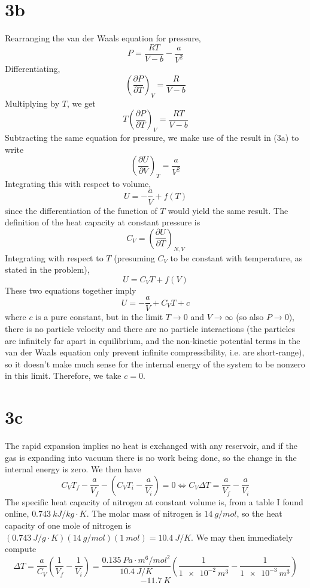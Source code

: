 \documentclass{article}
\begin{document}
\section*{3b}
Rearranging the van der Waals equation for pressure,
\[P=\frac{RT}{V-b}-\frac{a}{V^{2}}\]
Differentiating,
\[\left( \frac{\partial P}{\partial T} \right)_{V}=\frac{R}{V-b}\]
Multiplying by $T$, we get
\[T\left( \frac{\partial P}{\partial T} \right)_{V}=\frac{RT}{V-b}\]
Subtracting the same equation for pressure, we make use of the result in (3a) to write
\[\left( \frac{\partial U}{\partial V} \right)_{T}=\frac{a}{V^{2}}\]
Integrating this with respect to volume,
\[U=-\frac{a}{V}+f(T)\]
since the differentiation of the function of $T$ would yield the same result.
The definition of the heat capacity at constant pressure is
\[C_{V}=\left( \frac{\partial U}{\partial T} \right)_{N,V}\]
Integrating with respect to $T$ (presuming $C_{V}$ to be constant with temperature, as stated in the problem),
\[U=C_{V}T+f(V)\]
These two equations together imply
\[U=-\frac{a}{V}+C_{V}T+c\]
where $c$ is a pure constant, but in the limit $T\to 0$ and $V\to \infty$ (so also $P \to 0$), there is no particle velocity and there are no particle interactions (the particles are infinitely far apart in equilibrium, and the non-kinetic potential terms in the van der Waals equation only prevent infinite compressibility, i.e. are short-range), so it doesn't make much sense for the internal energy of the system to be nonzero in this limit.
Therefore, we take $c=0$.

\section*{3c}
The rapid expansion implies no heat is exchanged with any reservoir, and if the gas is expanding into vacuum there is no work being done, so the change in the internal energy is zero.
We then have
\[C_{V}T_{f}-\frac{a}{V_{f}}-\left( C_{V}T_{i}-\frac{a}{V_{i}} \right)=0\Leftrightarrow C_{V}\Delta T=\frac{a}{V_{f}}-\frac{a}{V_{i}}\]
The specific heat capacity of nitrogen at constant volume is, from a table I found online, $\SI{0.743}{kJ/kg\cdot K}$. The molar mass of nitrogen is $\SI{14}{g/mol}$, so the heat capacity of one mole of nitrogen is \newline $(\SI{0.743}{J/g\cdot K})(\SI{14}{g/mol})(\SI{1}{mol})=\SI{10.4}{J/K}$. We may then immediately compute
\[\Delta T=\frac{a}{C_{V}}\left( \frac{1}{V_{f}}-\frac{1}{V_{i}} \right)=\frac{\SI{0.135}{Pa\cdot m^{6}/mol^{2}}}{\SI{10.4}{J/K}}\left( \frac{1}{\SI{1e-2}{m^{3}}}-\frac{1}{\SI{1e-3}{m^{3}}} \right)\]
\[\SI{-11.7}{K}\]
\end{document}
